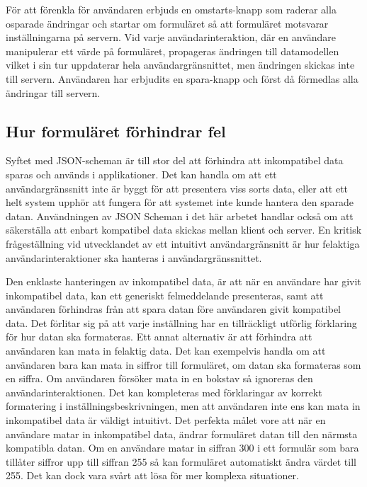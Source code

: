 För att förenkla för användaren erbjuds en omstarts-knapp som raderar alla osparade ändringar och startar om formuläret så att formuläret motsvarar inställningarna på servern. Vid varje användarinteraktion, där en användare manipulerar ett värde på formuläret, propageras ändringen till datamodellen vilket i sin tur uppdaterar hela användargränsnittet, men ändringen skickas inte till servern. Användaren har erbjudits en spara-knapp och först då förmedlas alla ändringar till servern.

\subsection{Hur formuläret förhindrar fel}

Syftet med JSON-scheman är till stor del att förhindra att inkompatibel data sparas och används i applikationer. Det kan handla om att ett användargränssnitt inte är byggt för att presentera viss sorts data, eller att ett helt system upphör att fungera för att systemet inte kunde hantera den sparade datan. Användningen av JSON Scheman i det här arbetet handlar också om att säkerställa att enbart kompatibel data skickas mellan klient och server. En kritisk frågeställning vid utvecklandet av ett intuitivt användargränsnitt är hur felaktiga användarinteraktioner ska hanteras i användargränssnittet.

Den enklaste hanteringen av inkompatibel data, är att när en användare har givit inkompatibel data, kan ett generiskt felmeddelande presenteras, samt att användaren förhindras från att spara datan före användaren givit kompatibel data. Det förlitar sig på att varje inställning har en tillräckligt utförlig förklaring för hur datan ska formateras. Ett annat alternativ är att förhindra att användaren kan mata in felaktig data. Det kan exempelvis handla om att användaren bara kan mata in siffror till formuläret, om datan ska formateras som en siffra. Om användaren försöker mata in en bokstav så ignoreras den användarinteraktionen. Det kan kompleteras med förklaringar av korrekt formatering i inställningsbeskrivningen, men att användaren inte ens kan mata in inkompatibel data är väldigt intuitivt. Det perfekta målet vore att när en användare matar in inkompatibel data, ändrar formuläret datan till den närmsta kompatibla datan. Om en användare matar in siffran 300 i ett formulär som bara tillåter siffror upp till siffran 255 så kan formuläret automatiskt ändra värdet till 255. Det kan dock vara svårt att lösa för mer komplexa situationer.

